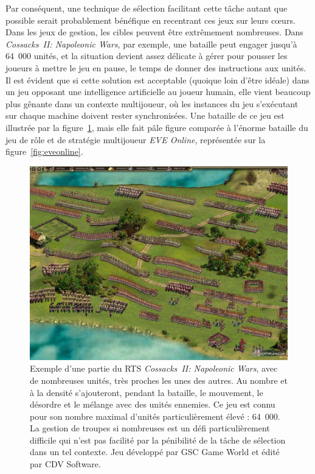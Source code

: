 	Par conséquent, une technique de sélection facilitant cette tâche autant que possible serait probablement bénéfique en recentrant ces jeux sur leurs cœurs. Dans les jeux de gestion, les cibles peuvent être extrêmement nombreuses. Dans \emph{Cossacks~II: Napoleonic Wars}, par exemple, une bataille peut engager jusqu'à 64~000 unités, et la situation devient assez délicate à gérer pour pousser les joueurs à mettre le jeu en pause, le temps de donner des instructions aux unités\footnotemark. Il est évident que si cette solution est acceptable (quoique loin d'être idéale) dans un jeu opposant une intelligence artificielle au joueur humain, elle vient beaucoup plus gênante dans un contexte multijoueur, où les instances du jeu s'exécutant sur chaque machine doivent rester synchronisées. Une bataille de ce jeu est illustrée par la figure~\ref{fig:cossacks2}, mais elle fait pâle figure comparée à l'énorme bataille du jeu de rôle et de stratégie multijoueur \emph{EVE Online}, représentée sur la figure~\ref{fig:eveonline}.
	
	
	\begin{figure}[htb]
		\centering
		\includegraphics[width=\textwidth]{figures/ch1/cossacks2}
		\caption[Un RTS avec de très nombreuses unités : \emph{Cossacks~II: Napoleonic Wars}.]{Exemple d'une partie du RTS \emph{Cossacks~II: Napoleonic Wars}, avec de nombreuses unités, très proches les unes des autres. Au nombre et à la densité s'ajouteront, pendant la bataille, le mouvement, le désordre et le mélange avec des unités ennemies. Ce jeu est connu pour son nombre maximal d'unités particulièrement élevé : 64~000. La gestion de troupes si nombreuses est un défi particulièrement difficile qui n'est pas facilité par la pénibilité de la tâche de sélection dans un tel contexte. Jeu développé par GSC Game World et édité par CDV Software.}
		\label{fig:cossacks2}
	\end{figure}
	
